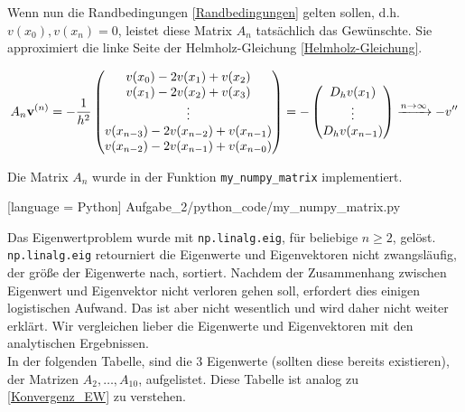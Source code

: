 Wenn nun die Randbedingungen \eqref{Randbedingungen} gelten sollen, d.h. $v(x_0), v(x_n) = 0$, leistet diese Matrix $A_n$ tatsächlich das Gewünschte. Sie approximiert die linke Seite der Helmholz-Gleichung \eqref{Helmholz-Gleichung}.

\begin{align*}
  A_n \mathbf{v}^{(n)} =
  -\frac{1}{h^2}
  \begin{pmatrix}
    v(x_0) - 2 v(x_1) + v(x_2)             \\
    v(x_1) - 2 v(x_2) + v(x_3)             \\
    \vdots                                 \\
    v(x_{n-3}) - 2 v(x_{n-2}) + v(x_{n-1}) \\
    v(x_{n-2}) - 2 v(x_{n-1}) + v(x_{n-0})
  \end{pmatrix} =
  -\begin{pmatrix}
    D_h v(x_1) \\
    \vdots     \\
    D_h v(x_{n-1})
  \end{pmatrix}
  \xrightarrow{n \to \infty}
  -v^{\prime \prime}
\end{align*}

Die Matrix $A_n$ wurde in der Funktion \verb|my_numpy_matrix| implementiert. \\

\newpage


[language = Python]
{Aufgabe_2/python_code/my_numpy_matrix.py}
\vspace{10pt}

Das Eigenwertproblem wurde mit \verb|np.linalg.eig|, für beliebige $n \geq 2$, gelöst. \verb|np.linalg.eig| retourniert die Eigenwerte und Eigenvektoren nicht zwangsläufig, der größe der Eigenwerte nach, sortiert. Nachdem der Zusammenhang zwischen Eigenwert und Eigenvektor nicht verloren gehen soll, erfordert dies einigen logistischen Aufwand. Das ist aber nicht wesentlich und wird daher nicht weiter erklärt. Wir vergleichen lieber die Eigenwerte und Eigenvektoren mit den analytischen Ergebnissen. \\

In der folgenden Tabelle, sind die $3$ Eigenwerte (sollten diese bereits existieren), der Matrizen $A_2, \ldots, A_{10}$, aufgelistet. Diese Tabelle ist analog zu \eqref{Konvergenz_EW} zu verstehen. \\


\vspace{10pt}

